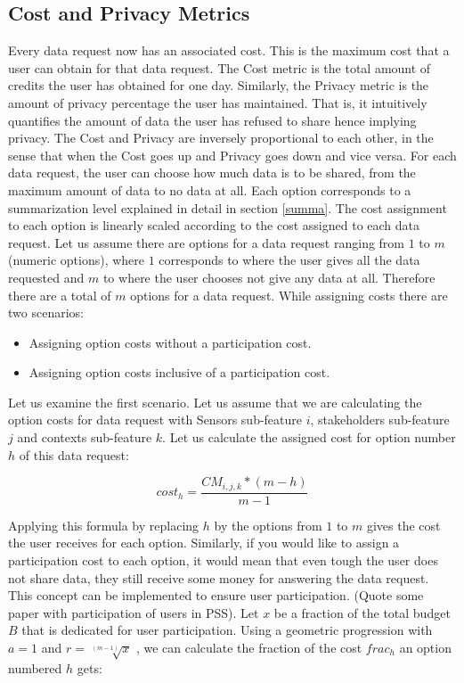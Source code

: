 \subsection{Cost and Privacy Metrics}
Every data request now has an associated cost. This is the maximum cost that a user can obtain for that data request.
The Cost metric is the total amount of credits the user has obtained for one day. Similarly, the Privacy metric is the amount of
privacy percentage the user has maintained. That is, it intuitively quantifies the amount of data the user has refused to share hence implying privacy. The Cost and Privacy are inversely proportional to each other, in the sense that when the Cost goes up and Privacy goes down and vice versa.
For each data request, the user can choose how much data is to be shared, from the maximum amount of data to no data at all. Each option corresponds to a summarization level explained in detail in section \ref{summa}. The cost assignment to each option is linearly scaled according
to the cost assigned to each data request. Let us assume there are options for a data request ranging from $1$ to $m$ (numeric options), where $1$ corresponds to where the user gives all the data requested and $m$ to where the user chooses not give any data at all. Therefore there are a total of $m$ options for a data request.
While assigning costs there are two scenarios:

\begin{itemize}
\item Assigning option costs without a participation cost.
\item Assigning option costs inclusive of a participation cost.
\end{itemize}

Let us examine the first scenario. Let us assume that we are calculating the option costs for data request with Sensors sub-feature $i$, stakeholders sub-feature $j$ and
contexts sub-feature $k$. Let us calculate the assigned cost for option number $h$ of this data request:

\begin{equation}
cost_{h} =  \frac{CM_{i,j,k}*(m-h)}{m-1}
\end{equation}

Applying this formula by replacing $h$ by the options from $1$ to $m$ gives the cost the user receives for each option.
Similarly, if you would like to assign a participation cost to each option, it would mean that even tough the user does not share data, they still
receive some money for answering the data request. This concept can be implemented to ensure user participation. (Quote some paper with
participation of users in PSS). Let $x$ be a fraction of the total budget $B$ that is dedicated for user participation. Using a geometric progression with $a=1$ and $r=\sqrt[(m-1)]{x}$ , we can calculate the fraction of the cost $frac_{h}$ an option numbered $h$ gets:

